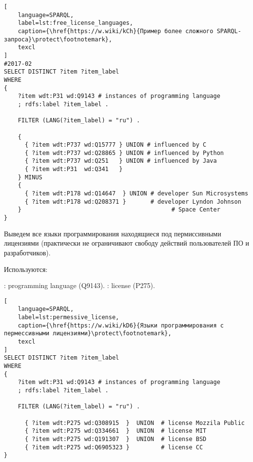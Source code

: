 \begin{lstlisting}[
	language=SPARQL,
	label=lst:free_license_languages,
	caption={\href{https://w.wiki/kCh}{Пример более сложного SPARQL-запроса}\protect\footnotemark},
	texcl
]
#2017-02
SELECT DISTINCT ?item ?item_label
WHERE
{
    ?item wdt:P31 wd:Q9143 # instances of programming language
    ; rdfs:label ?item_label . 

    FILTER (LANG(?item_label) = "ru") . 

    {
      { ?item wdt:P737 wd:Q15777 } UNION # influenced by C
      { ?item wdt:P737 wd:Q28865 } UNION # influenced by Python
      { ?item wdt:P737 wd:Q251   } UNION # influenced by Java
      { ?item wdt:P31  wd:Q341   }
    } MINUS 
  	{ 
      { ?item wdt:P178 wd:Q14647  } UNION # developer Sun Microsystems
      { ?item wdt:P178 wd:Q208371 }       # developer Lyndon Johnson
    }  										    # Space Center
}
\end{lstlisting}


Выведем все языки программирования находящиеся под пермиссивными лицензиями (практически не ограничивают свободу действий пользователей ПО и разработчиков).

Используются:
\begin{itemize}
: programming language (Q9143).
: license (P275).
\end{itemize}

\begin{lstlisting}[
	language=SPARQL,
	label=lst:permessive_license,
	caption={\href{https://w.wiki/kD6}{Языки программирования с пермессивными лицензиями}\protect\footnotemark},
	texcl
]
SELECT DISTINCT ?item ?item_label
WHERE
{
    ?item wdt:P31 wd:Q9143 # instances of programming language
    ; rdfs:label ?item_label . 

    FILTER (LANG(?item_label) = "ru") . 
  
      { ?item wdt:P275 wd:Q308915  }  UNION  # license Mozzila Public
      { ?item wdt:P275 wd:Q334661  }  UNION  # license MIT
      { ?item wdt:P275 wd:Q191307  }  UNION  # license BSD
      { ?item wdt:P275 wd:Q6905323 }         # license CC
}
\end{lstlisting}

